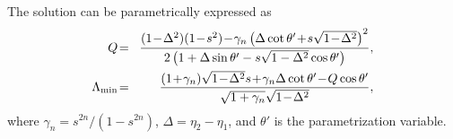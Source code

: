 \documentclass{beamer}
\begin{document}
\begin{frame}
The solution can be parametrically expressed as
\begin{eqnarray}
Q\!&=&\!{(1\!-\!\Delta^2)(1\!-\!s^2)\!-\!\gamma_n\left(\Delta\cot\theta'\!+\!s\sqrt{1\!-\!\Delta^2}\right)^2\over2\left(1+\Delta\sin\theta'-s\sqrt{1-\Delta^2}\cos\theta'\right)},
\nonumber\\
\Lambda_{\rm min} \!&=&\!{(1\!+\!\gamma_n)\sqrt{1\!-\!\Delta^2}s\!+\!\gamma_n\Delta\cot\theta'\!-\!Q\cos\theta'\over\sqrt{1+\gamma_n}\sqrt{1\!-\!\Delta^2}},
\end{eqnarray}
where $\gamma_n=s^{2n}/(1-s^{2n})$, $\Delta=\eta_2-\eta_1$, and $\theta'$ is the parametrization variable.

\end{frame}
\end{document}
